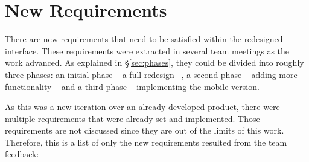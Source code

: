 \section{New Requirements} %
\label{sec:new_requirements}

There are new requirements that need to be satisfied within the redesigned  interface.
These requirements were extracted in several team meetings as the work advanced.
As explained in \S\vref{sec:phases}, they could be divided into roughly three phases: an initial phase -- a full redesign --, a second phase -- adding more functionality -- and a third phase -- implementing the mobile version.

As this was a new iteration over an already developed product, there were multiple requirements that were already set and implemented.
Those requirements are not discussed since they are out of the limits of this work.
Therefore, this is a list of only the new requirements resulted from the team feedback:

\begin{center}
  \begin{userrequirement}
    \label{tab:requirementredesign}%
  \end{userrequirement}
\end{center}

\begin{center}
  \begin{userrequirement}
    \label{tab:requirementreadapt}%
  \end{userrequirement}
\end{center}

\begin{center}
  \begin{userrequirement}
    \label{tab:requirementdevicename}%
  \end{userrequirement}
\end{center}

